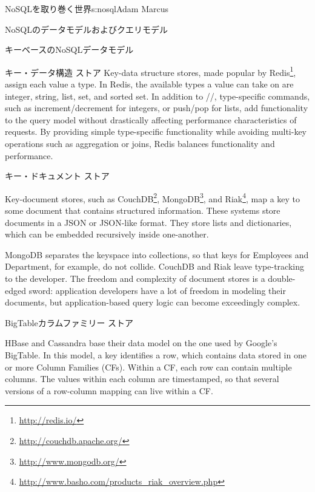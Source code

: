 \begin{aosachapter}{NoSQLを取り巻く世界}{s:nosql}{Adam Marcus}
\begin{aosasect1}{NoSQLのデータモデルおよびクエリモデル}
\begin{aosasect2}{キーベースのNoSQLデータモデル}
\begin{aosasect3}{キー・データ構造 ストア}
Key-data structure stores, made popular by Redis\footnote{\url{http://redis.io/}}, assign each value a
type.  In Redis, the available types a value can take on are integer,
string, list, set, and sorted set.  In addition to
//, type-specific commands, such as
increment/decrement for integers, or push/pop for lists, add
functionality to the query model without drastically affecting
performance characteristics of requests.  By providing simple
type-specific functionality while avoiding multi-key operations such as
aggregation or joins, Redis balances functionality and performance.

\end{aosasect3}

\begin{aosasect3}{キー・ドキュメント ストア}

Key-document stores, such as CouchDB\footnote{\url{http://couchdb.apache.org/}}, MongoDB\footnote{\url{http://www.mongodb.org/}}, and Riak\footnote{\url{http://www.basho.com/products_riak_overview.php}}, map a key to
some document that contains structured information.  These systems
store documents in a JSON or JSON-like format.  They store lists and
dictionaries, which can be embedded recursively inside one-another.

MongoDB separates the keyspace into collections, so that keys for
Employees and Department, for example, do not collide.  CouchDB and
Riak leave type-tracking to the developer.  The freedom and complexity
of document stores is a double-edged sword: application developers
have a lot of freedom in modeling their documents, but
application-based query logic can become exceedingly complex.

\end{aosasect3}

\begin{aosasect3}{BigTableカラムファミリー ストア}

HBase and Cassandra base their data model on the one used by Google's
BigTable.  In this model, a key identifies a row, which contains data
stored in one or more Column Families (CFs).  Within a CF, each row
can contain multiple columns.  The values within each column are
timestamped, so that several versions of a row-column mapping can live
within a CF.


\end{aosasect3}
\end{aosasect2}
\end{aosasect1}
\end{aosachapter}
